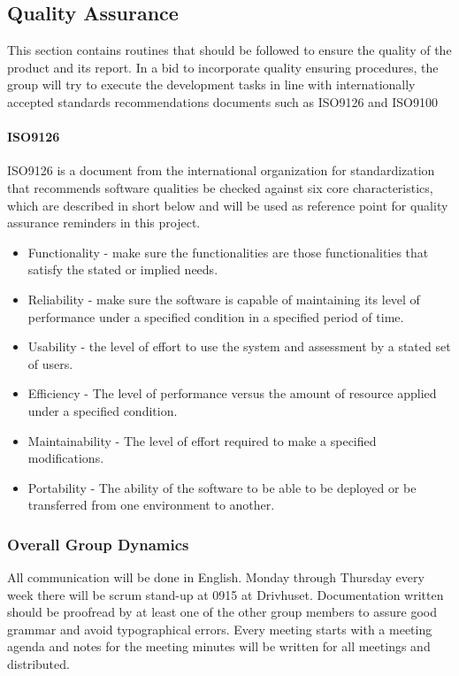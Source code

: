 \subsection{Quality Assurance}

This section contains routines that should be followed to ensure the
quality of the product and its report. In a bid to incorporate quality ensuring procedures, the group will try to execute the development tasks in line with internationally accepted standards recommendations documents such as ISO9126 and ISO9100

\paragraph{ISO9126}
ISO9126 is a document from the international organization for standardization that recommends software qualities be checked against six core characteristics, which are described in short below and will be used as reference point for quality assurance reminders in this project\cite{iso:9126}.

\begin{itemize}
		\item Functionality - make sure the functionalities are those functionalities that satisfy the stated or implied needs.
		\item Reliability - make sure the software is capable of maintaining its level of performance under a specified condition in a specified period of time.
		\item Usability - the level of effort to use the system and assessment by a stated set of users.
		\item Efficiency - The level of performance versus the amount of resource applied under a specified condition.
        \item Maintainability - The level of effort required to make a specified modifications.
        \item Portability - The ability of the software to be able to be deployed or be transferred from one environment to another.
\end{itemize}


\subsubsection{Overall Group Dynamics}

All communication will be done in English.
Monday through Thursday every week there will be scrum stand-up at 0915 at Drivhuset.
Documentation written should be proofread by at least one of the other group members
to assure good grammar and avoid typographical errors.
Every meeting starts with a meeting agenda and notes for the meeting minutes will be
written for all meetings and distributed.

